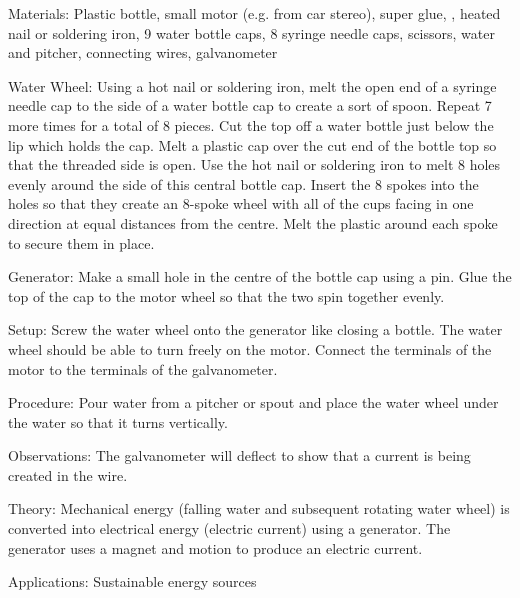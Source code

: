 \begin{multicols}{2}
\begin{description*}
\item[Materials:]{Plastic bottle, small motor (e.g. from car stereo), super glue, , heated nail or soldering iron, 9 water bottle caps, 8 syringe needle caps, scissors, water and pitcher, connecting wires, galvanometer}
\item[Water Wheel:]{Using a hot nail or soldering iron, melt the open end of a syringe needle cap to the side of a water bottle cap to create a sort of spoon. Repeat 7 more times for a total of 8 pieces. Cut the top off a water bottle just below the lip which holds the cap. Melt a plastic cap over the cut end of the bottle top so that the threaded side is open. Use the hot nail or soldering iron to melt 8 holes evenly around the side of this central bottle cap. Insert the 8 spokes into the holes so that they create an 8-spoke wheel with all of the cups facing in one direction at equal distances from the centre. Melt the plastic around each spoke to secure them in place.}
\item[Generator:]{Make a small hole in the centre of the bottle cap using a pin. Glue the top of the cap to the motor wheel so that the two spin together evenly.}
\item[Setup:]{Screw the water wheel onto the generator like closing a bottle. The water wheel should be able to turn freely on the motor. Connect the terminals of the motor to the terminals of the galvanometer.}
\item[Procedure:]{Pour water from a pitcher or spout and place the water wheel under the water so that it turns vertically.}
\item[Observations:]{The galvanometer will deflect to show that a current is being created in the wire.}
\item[Theory:]{Mechanical energy (falling water and subsequent rotating water wheel) is converted into electrical energy (electric current) using a generator. The generator uses a magnet and motion to produce an electric current.}
\item[Applications:]{Sustainable energy sources}
\end{description*}

\end{multicols}

